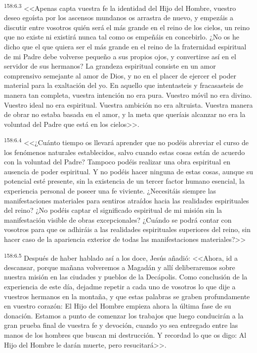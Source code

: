 \par 
\textsuperscript{158:6.3} <<Apenas capta vuestra fe la identidad del Hijo del Hombre, vuestro deseo egoísta por los ascensos mundanos os arrastra de nuevo, y empezáis a discutir entre vosotros quién será el más grande en el reino de los cielos, un reino que no existe ni existirá nunca tal como os empeñáis en concebirlo. ¿No os he dicho que el que quiera ser el más grande en el reino de la fraternidad espiritual de mi Padre debe volverse pequeño a sus propios ojos, y convertirse así en el servidor de sus hermanos? La grandeza espiritual consiste en un amor comprensivo semejante al amor de Dios, y no en el placer de ejercer el poder material para la exaltación del yo. En aquello que intentasteis y fracasasteis de manera tan completa, vuestra intención no era pura. Vuestro móvil no era divino. Vuestro ideal no era espiritual. Vuestra ambición no era altruista. Vuestra manera de obrar no estaba basada en el amor, y la meta que queríais alcanzar no era la voluntad del Padre que está en los cielos>>.

\par 
\textsuperscript{158:6.4} <<¿Cuánto tiempo os llevará aprender que no podéis abreviar el curso de los fenómenos naturales establecidos, salvo cuando estas cosas están de acuerdo con la voluntad del Padre? Tampoco podéis realizar una obra espiritual en ausencia de poder espiritual. Y no podéis hacer ninguna de estas cosas, aunque su potencial esté presente, sin la existencia de un tercer factor humano esencial, la experiencia personal de poseer una fe viviente. ¿Necesitáis siempre las manifestaciones materiales para sentiros atraídos hacia las realidades espirituales del reino? ¿No podéis captar el significado espiritual de mi misión sin la manifestación visible de obras excepcionales? ¿Cuándo se podrá contar con vosotros para que os adhiráis a las realidades espirituales superiores del reino, sin hacer caso de la apariencia exterior de todas las manifestaciones materiales?>>

\par 
\textsuperscript{158:6.5} Después de haber hablado así a los doce, Jesús añadió: <<Ahora, id a descansar, porque mañana volveremos a Magadán y allí deliberaremos sobre nuestra misión en las ciudades y pueblos de la Decápolis. Como conclusión de la experiencia de este día, dejadme repetir a cada uno de vosotros lo que dije a vuestros hermanos en la montaña, y que estas palabras se graben profundamente en vuestro corazón: El Hijo del Hombre empieza ahora la última fase de su donación. Estamos a punto de comenzar los trabajos que luego conducirán a la gran prueba final de vuestra fe y devoción, cuando yo sea entregado entre las manos de los hombres que buscan mi destrucción. Y recordad lo que os digo: Al Hijo del Hombre le darán muerte, pero resucitará>>.

